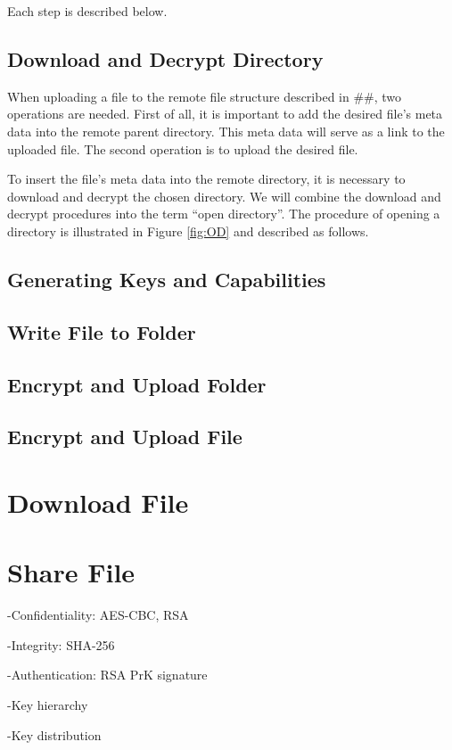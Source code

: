\documentclass[english,12pt,a4paper]{book}
\begin{document}
Each step is described below.

\subsection{Download and Decrypt Directory}
When uploading a file to the remote file structure described in \#\#, two
operations are needed. First of all, it is important to add the desired file's
meta data into the remote parent directory. This meta data will serve as a link
to the uploaded file. The second operation is to upload the desired file.

To insert the file's meta data into the remote directory, it is necessary to
download and decrypt the chosen directory. We will combine the download and
decrypt procedures into the term ``open directory''. The procedure of opening a
directory is illustrated in Figure \ref{fig:OD} and described as follows.



\subsection{Generating Keys and Capabilities}

\subsection{Write File to Folder}

\subsection{Encrypt and Upload Folder}

\subsection{Encrypt and Upload File}

\section{Download File}

\section{Share File}
{
-Confidentiality: AES-CBC, RSA

-Integrity: SHA-256

-Authentication: RSA PrK signature

-Key hierarchy

-Key distribution
}
\end{document}
